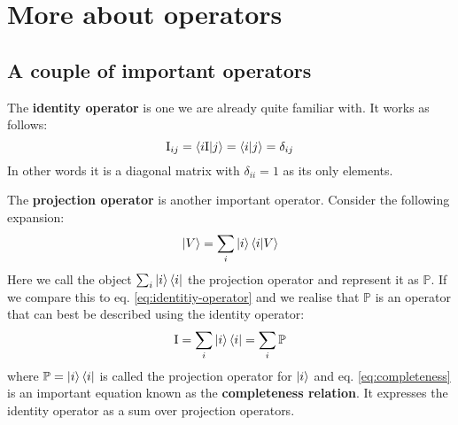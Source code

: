 \documentclass[english,seminar,headertitle]{lecture}
\begin{document}
\vspace{0.35cm}

\noindent{}\\

\noindent{}\\

\section{More about operators}
\subsection{A couple of important operators}

The \textbf{identity operator} is one we are already quite familiar with. It works as follows:
\begin{equation}
	\textrm{I}_{ij} = \braket{i \textrm{I} | j} = \braket{i|j} = \delta_{ij} \label{eq:identitiy-operator}
\end{equation}
In other words it is a diagonal matrix with $\delta_{ii} = 1$ as its only elements.

The \textbf{projection operator} is another important operator. Consider the following expansion:
\[
	\ket{V} = \sum_i \ket{i}\braket{i|V}
\]
Here we call the object $\sum_i \ket{i}\bra{i}$ the projection operator and represent it as $\mathbb{P}$. If we compare this to eq. \eqref{eq:identitiy-operator} and we realise that $\mathbb{P}$ is an operator that can best be described using the identity operator:
\begin{equation}
	\textrm{I} = \sum_i \ket{i}\bra{i} = \sum_i \mathbb{P} \label{eq:completeness}
\end{equation}
where $\mathbb{P} = \ket{i}\bra{i}$ is called the projection operator for $\ket{i}$ and eq. \eqref{eq:completeness} is an important equation known as the \textbf{completeness relation}. It expresses the identity operator as a sum over projection operators.
\end{document}
